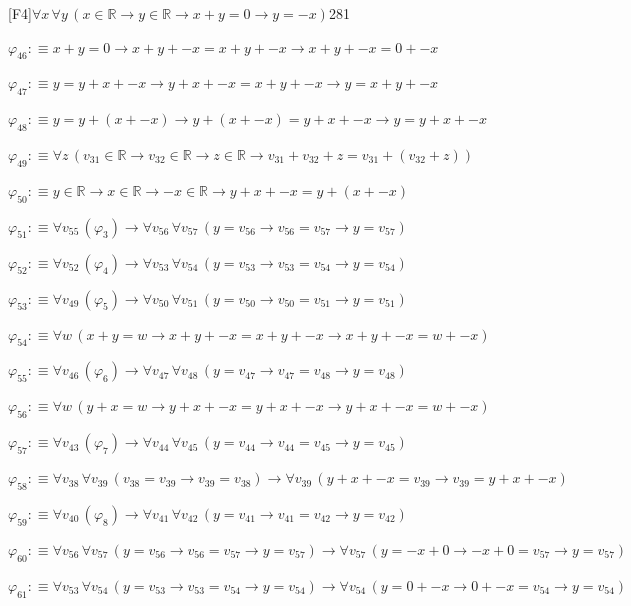\begin{fullproof}{[F4]}{$\forall x\,\forall y\,(x \in \mathbb{R} \to y \in \mathbb{R} \to x + y = 0 \to y = -x)$}{281}
\begin{abbrevlist}
\item $\varphi_{46} :\equiv x + y = 0 \to x + y + -x = x + y + -x \to x + y + -x = 0 + -x$
\item $\varphi_{47} :\equiv y = y + x + -x \to y + x + -x = x + y + -x \to y = x + y + -x$
\item $\varphi_{48} :\equiv y = y + (x + -x) \to y + (x + -x) = y + x + -x \to y = y + x + -x$
\item $\varphi_{49} :\equiv \forall z\,(v_{31} \in \mathbb{R} \to v_{32} \in \mathbb{R} \to z \in \mathbb{R} \to v_{31} + v_{32} + z = v_{31} + (v_{32} + z))$
\item $\varphi_{50} :\equiv y \in \mathbb{R} \to x \in \mathbb{R} \to -x \in \mathbb{R} \to y + x + -x = y + (x + -x)$
\item $\varphi_{51} :\equiv \forall v_{55}\,(\varphi_{3}) \to \forall v_{56}\,\forall v_{57}\,(y = v_{56} \to v_{56} = v_{57} \to y = v_{57})$
\item $\varphi_{52} :\equiv \forall v_{52}\,(\varphi_{4}) \to \forall v_{53}\,\forall v_{54}\,(y = v_{53} \to v_{53} = v_{54} \to y = v_{54})$
\item $\varphi_{53} :\equiv \forall v_{49}\,(\varphi_{5}) \to \forall v_{50}\,\forall v_{51}\,(y = v_{50} \to v_{50} = v_{51} \to y = v_{51})$
\item $\varphi_{54} :\equiv \forall w\,(x + y = w \to x + y + -x = x + y + -x \to x + y + -x = w + -x)$
\item $\varphi_{55} :\equiv \forall v_{46}\,(\varphi_{6}) \to \forall v_{47}\,\forall v_{48}\,(y = v_{47} \to v_{47} = v_{48} \to y = v_{48})$
\item $\varphi_{56} :\equiv \forall w\,(y + x = w \to y + x + -x = y + x + -x \to y + x + -x = w + -x)$
\item $\varphi_{57} :\equiv \forall v_{43}\,(\varphi_{7}) \to \forall v_{44}\,\forall v_{45}\,(y = v_{44} \to v_{44} = v_{45} \to y = v_{45})$
\item $\varphi_{58} :\equiv \forall v_{38}\,\forall v_{39}\,(v_{38} = v_{39} \to v_{39} = v_{38}) \to \forall v_{39}\,(y + x + -x = v_{39} \to v_{39} = y + x + -x)$
\item $\varphi_{59} :\equiv \forall v_{40}\,(\varphi_{8}) \to \forall v_{41}\,\forall v_{42}\,(y = v_{41} \to v_{41} = v_{42} \to y = v_{42})$
\item $\varphi_{60} :\equiv \forall v_{56}\,\forall v_{57}\,(y = v_{56} \to v_{56} = v_{57} \to y = v_{57}) \to \forall v_{57}\,(y = -x + 0 \to -x + 0 = v_{57} \to y = v_{57})$
\item $\varphi_{61} :\equiv \forall v_{53}\,\forall v_{54}\,(y = v_{53} \to v_{53} = v_{54} \to y = v_{54}) \to \forall v_{54}\,(y = 0 + -x \to 0 + -x = v_{54} \to y = v_{54})$

\end{abbrevlist}
\end{fullproof}

